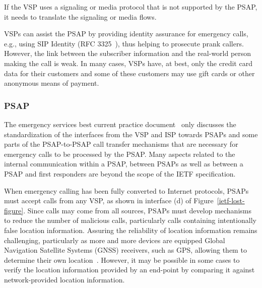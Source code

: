 \documentclass[12pt]{article}
\begin{document}
If the VSP uses a signaling or media protocol that is not supported by the PSAP, it needs to translate the signaling or media flows.

VSPs can assist the PSAP by providing identity assurance for emergency calls, e.g., using SIP Identity (RFC 3325~\cite{rfc3325}), thus helping to prosecute prank callers. However, the link between the subscriber information and the real-world person making the call is weak. In many cases, VSPs have, at best, only the credit card data for their customers and some of these customers may use gift cards or other anonymous means of payment. 

\subsubsection{PSAP\\}

The emergency services best current practice document~\cite{draft-ietf-ecrit-phonebcp} only discusses the standardization of the interfaces from the VSP and ISP towards PSAPs and some parts of the PSAP-to-PSAP call transfer mechanisms that are necessary for emergency calls to be processed by the PSAP. Many aspects related to the internal communication within a PSAP, between PSAPs as well as between a PSAP and first responders are beyond the scope of the IETF specification.

When emergency calling has been fully converted to Internet protocols, PSAPs must accept calls from any VSP, as shown in interface (d) of Figure~\ref{ietf-lost-figure}.  Since calls may come from all sources, PSAPs must develop mechanisms to reduce the number of malicious calls, particularly calls containing intentionally false location information. Assuring the reliability of location information remains challenging, particularly as more and more devices are equipped Global Navigation Satellite Systems (GNSS) receivers, such as GPS, allowing them to determine their own location~\cite{draft-ietf-ecrit-trustworthy-location}. However, it may be possible in some cases to verify the location information provided by an end-point by comparing it against network-provided location information.
\end{document}
